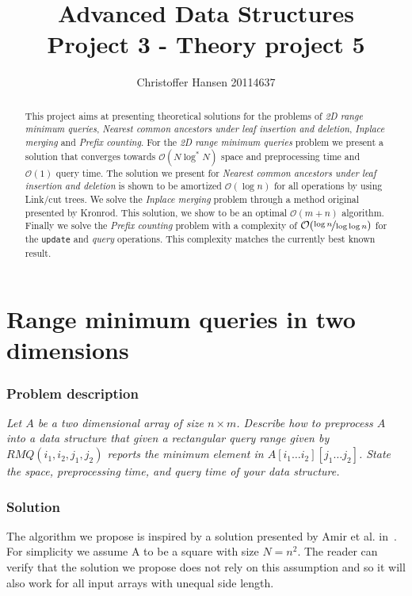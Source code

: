 \documentclass[a4paper,oneside,article,11pt]{memoir}
\title{Advanced Data Structures \\ Project 3 - Theory project 5}
\author{Christoffer Hansen 20114637}
\begin{document}
\begin{titlingpage}
\clearpage

\maketitle
\thispagestyle{empty}

\begin{abstract}
This project aims at presenting theoretical solutions for the problems of \textit{2D range minimum queries}, \textit{Nearest common ancestors under leaf insertion and deletion}, \textit{Inplace merging} and \textit{Prefix counting}. For the \textit{2D range minimum queries} problem we present a solution that converges towards $\mathcal{O}(N \log^* N)$ space and preprocessing time and $\mathcal{O}(1)$ query time. The solution we present for \textit{Nearest common ancestors under leaf insertion and deletion} is shown to be amortized $\mathcal{O}(\log n)$ for all operations by using Link/cut trees. We solve the \textit{Inplace merging} problem through a method original presented by Kronrod. This solution, we show to be an optimal $\mathcal{O}(m+n)$ algorithm. Finally we solve the \textit{Prefix counting} problem with a complexity of $\mathcal{O}(\nicefrac{\log n}{\log \log n})$ for the \texttt{update} and \textit{query} operations. This complexity matches the currently best known result.
\end{abstract}
\end{titlingpage}

\pagebreak

\tableofcontents

\pagebreak

\chapter{Range minimum queries in two dimensions}
\label{chp:rmq2d}
\subsection{Problem description}
\textit{Let $A$ be a two dimensional array of size $n \times m$. Describe how to preprocess $A$ into a data structure that given a rectangular query range given by $RMQ(i_1,i_2,j_1,j_2)$ reports the minimum element in $A\left[ i_1\dots i_2\right]\left[j_1\dots j_2\right]$. State the space, preprocessing time, and query time of your data structure.}

\subsection{Solution}
The algorithm we propose is inspired by a solution presented by Amir et al. in~\cite{AmirFL07}. For simplicity we assume A to be a square with size $N = n^2$. The reader can verify that the solution we propose does not rely on this assumption and so it will also work for all input arrays with unequal side length.
\end{document}
